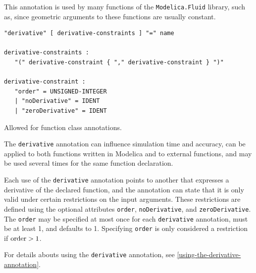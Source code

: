\begin{annotationdefinition}[smoothOrder]
\begin{semantics}
\begin{nonnormative}
This annotation is used by many functions of the {\lstinline!Modelica.Fluid!} library, such as, since geometric arguments to these functions are usually constant.
\end{nonnormative}
\end{semantics}
\end{annotationdefinition}

\begin{annotationdefinition}[derivative]
\begin{synopsis}[grammar]\begin{lstlisting}
"derivative" [ derivative-constraints ] "=" name

derivative-constraints :
   "(" derivative-constraint { "," derivative-constraint } ")"

derivative-constraint :
   "order" = UNSIGNED-INTEGER
   | "noDerivative" = IDENT
   | "zeroDerivative" = IDENT
\end{lstlisting}\end{synopsis}
\begin{semantics}
Allowed for function class annotations.

The {\lstinline!derivative!} annotation can influence simulation time and accuracy, can be applied to both functions written in Modelica and to external functions, and may be used several times for the same function declaration.

Each use of the {\lstinline!derivative!} annotation points to another  that expresses a derivative of the declared function, and the annotation can state that it is only valid under certain restrictions on the input arguments.
These restrictions are defined using the optional attributes {\lstinline!order!}, {\lstinline!noDerivative!}, and {\lstinline!zeroDerivative!}.
The {\lstinline!order!} may be specified at most once for each {\lstinline!derivative!} annotation, must be at least 1, and defaults to 1.
Specifying {\lstinline!order!} is only considered a restriction if $\text{{\lstinline!order!}} > 1$.

For details abouts using the {\lstinline!derivative!} annotation, see \cref{using-the-derivative-annotation}.
\end{semantics}
\end{annotationdefinition}

